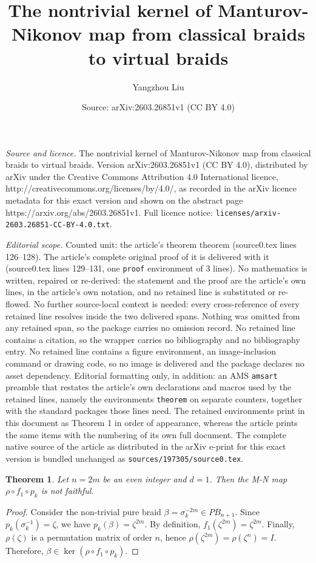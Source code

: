 \documentclass[10pt,a4paper]{amsart}
\title{The nontrivial kernel of Manturov-Nikonov map from classical braids to virtual braids}
\author{Yangzhou Liu}
\date{Source: arXiv:2603.26851v1 (CC BY 4.0)}
\newtheorem{theorem}{Theorem}
\begin{document}
\maketitle

\noindent\emph{Source and licence.} The nontrivial kernel of Manturov-Nikonov map from classical braids to virtual braids. Version arXiv:2603.26851v1 (CC BY 4.0), distributed by arXiv under the Creative Commons Attribution 4.0 International licence, http://creativecommons.org/licenses/by/4.0/, as recorded in the arXiv licence metadata for this exact version and shown on the abstract page https://arxiv.org/abs/2603.26851v1. Full licence notice: \texttt{licenses/arxiv-2603.26851-CC-BY-4.0.txt}.\par\smallskip

\noindent\textit{Editorial scope.} Counted unit: the article's theorem theorem (source0.tex lines 126--128). The article's complete original proof of it is delivered with it (source0.tex lines 129--131, one \texttt{proof} environment of 3 lines). No mathematics is written, repaired or re-derived: the statement and the proof are the article's own lines, in the article's own notation, and no retained line is substituted or re-flowed.  No further source-local context is needed: every cross-reference of every retained line resolves inside the two delivered spans.  Nothing was omitted from any retained span, so the package carries no omission record.  No retained line contains a citation, so the wrapper carries no bibliography and no bibliography entry.  No retained line contains a figure environment, an image-inclusion command or drawing code, so no image is delivered and the package declares no asset dependency.  Editorial formatting only, in addition: an AMS \texttt{amsart} preamble that restates the article's own declarations and macros used by the retained lines, namely the environments \texttt{theorem} on separate counters, together with the standard packages those lines need.  The retained environments print in this document as Theorem 1 in order of appearance, whereas the article prints the same items with the numbering of its own full document.  The complete native source of the article as distributed in the arXiv e-print for this exact version is bundled unchanged as \texttt{sources/197305/source0.tex}.
\begin{theorem}
Let $n = 2m$ be an even integer and $d = 1$. Then the M-N map $\rho \circ f_1 \circ p_k$ is not faithful.
\end{theorem}

\begin{proof}
Consider the non-trivial pure braid $\beta = \sigma_k^{-2m} \in PB_{n+1}$. Since $p_k(\sigma_k^{-1}) = \zeta$, we have $p_k(\beta) = \zeta^{2m}$. By definition, $f_1(\zeta^{2m}) = \zeta^{2m}$. Finally, $\rho(\zeta)$ is a permutation matrix of order $n$, hence $\rho(\zeta^{2m}) = \rho(\zeta^n) = I$. Therefore, $\beta \in \ker(\rho \circ f_1 \circ p_k)$.
\end{proof}
\end{document}
